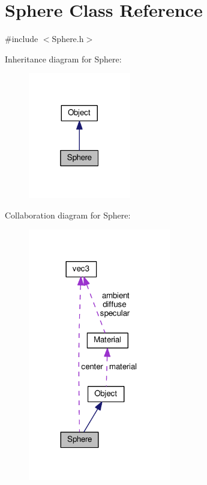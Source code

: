 \hypertarget{classSphere}{}\section{Sphere Class Reference}
\label{classSphere}


{\ttfamily \#include $<$Sphere.\+h$>$}



Inheritance diagram for Sphere\+:
\nopagebreak
\begin{figure}[H]
\begin{center}
\leavevmode
\includegraphics[width=127pt]{classSphere__inherit__graph}
\end{center}
\end{figure}


Collaboration diagram for Sphere\+:
\nopagebreak
\begin{figure}[H]
\begin{center}
\leavevmode
\includegraphics[width=176pt]{classSphere__coll__graph}
\end{center}
\end{figure}
